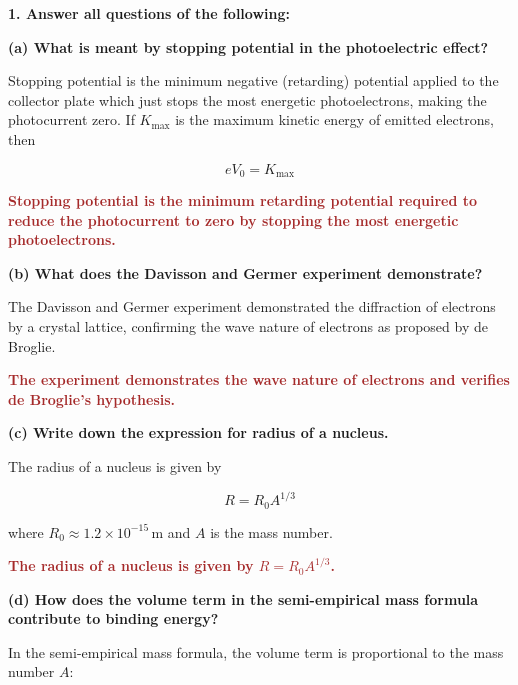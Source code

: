 \documentclass[a4paper, 12pt]{article}
\title{}
\author{}
\begin{document}
\maketitle


\textbf{1. Answer all questions of the following:}

\textbf{(a) What is meant by stopping potential in the photoelectric effect?}

Stopping potential is the minimum negative (retarding) potential applied to the collector plate which just stops the most energetic photoelectrons, making the photocurrent zero.  
If $K_{\text{max}}$ is the maximum kinetic energy of emitted electrons, then

\[
eV_0 = K_{\text{max}}
\]

\textbf{\textcolor{brown}{\textbf{Stopping potential is the minimum retarding potential required to reduce the photocurrent to zero by stopping the most energetic photoelectrons.}}}

\vspace{0.5cm}

\textbf{(b) What does the Davisson and Germer experiment demonstrate?}

The Davisson and Germer experiment demonstrated the diffraction of electrons by a crystal lattice, confirming the wave nature of electrons as proposed by de Broglie.

\textbf{\textcolor{brown}{\textbf{The experiment demonstrates the wave nature of electrons and verifies de Broglie’s hypothesis.}}}

\vspace{0.5cm}

\textbf{(c) Write down the expression for radius of a nucleus.}

The radius of a nucleus is given by

\[
R = R_0 A^{1/3}
\]

where $R_0 \approx 1.2 \times 10^{-15}\,\text{m}$ and $A$ is the mass number.

\textbf{\textcolor{brown}{\textbf{The radius of a nucleus is given by $R = R_0 A^{1/3}$.}}}

\vspace{0.5cm}

\textbf{(d) How does the volume term in the semi-empirical mass formula contribute to binding energy?}

In the semi-empirical mass formula, the volume term is proportional to the mass number $A$:
\end{document}
